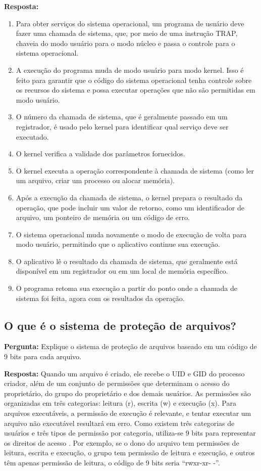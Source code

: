 \documentclass{article}
\begin{document}
\textbf{Resposta:}
\begin{enumerate}
    \item Para obter serviços do sistema operacional, um programa de usuário deve fazer uma chamada de sistema, que, por meio de uma instrução TRAP, chaveia do modo usuário para o modo núcleo e passa o controle para o sistema operacional.
    \item A execução do programa muda de modo usuário para modo kernel. Isso é feito para garantir que o código do sistema operacional tenha controle sobre os recursos do sistema e possa executar operações que não são permitidas em modo usuário.
    \item O número da chamada de sistema, que é geralmente passado em um registrador, é usado pelo kernel para identificar qual serviço deve ser executado.
    \item O kernel verifica a validade dos parâmetros fornecidos.
    \item O kernel executa a operação correspondente à chamada de sistema (como ler um arquivo, criar um processo ou alocar memória).
    \item Após a execução da chamada de sistema, o kernel prepara o resultado da operação, que pode incluir um valor de retorno, como um identificador de arquivo, um ponteiro de memória ou um código de erro.
    \item O sistema operacional muda novamente o modo de execução de volta para modo usuário, permitindo que o aplicativo continue sua execução.
    \item O aplicativo lê o resultado da chamada de sistema, que geralmente está disponível em um registrador ou em um local de memória específico.
    \item O programa retoma sua execução a partir do ponto onde a chamada de sistema foi feita, agora com os resultados da operação. \cite{tanenbaum2021}
\end{enumerate}

\subsection{O que é o sistema de proteção de arquivos?}
\textbf{Pergunta:} Explique o sistema de proteção de arquivos baseado em um código de 9 bits para cada arquivo.\newline

\textbf{Resposta:}
Quando um arquivo é criado, ele recebe o UID e GID do processo criador, além de um conjunto de permissões que determinam o acesso do proprietário, do grupo do proprietário e dos demais usuários. As permissões são organizadas em três categorias: leitura (r), escrita (w) e execução (x). Para arquivos executáveis, a permissão de execução é relevante, e tentar executar um arquivo não executável resultará em erro. Como existem três categorias de usuários e três tipos de permissão por categoria, utiliza-se 9 bits para representar os direitos de acesso \cite{tanenbaum2021}.
Por exemplo, se o dono do arquivo tem permissões de leitura, escrita e execução, o grupo tem permissão de leitura e execução, e outros têm apenas permissão de leitura, o código de 9 bits seria ``rwxr-xr- -''.
\end{document}
